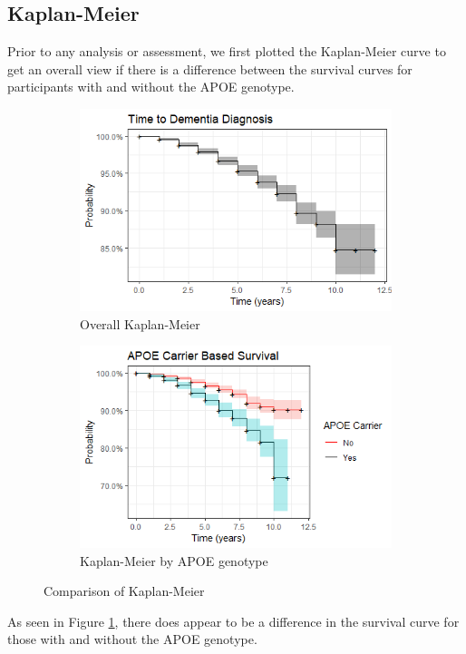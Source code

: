 \documentclass[a4paper,man,natbib,11pt]{article}
\begin{document}
\subsection{Kaplan-Meier}

Prior to any analysis or assessment, we first plotted the Kaplan-Meier curve to get an overall view if there is a difference between the survival curves for participants with and without the APOE genotype. 

\begin{figure}[h!]
\centering
\begin{subfigure}{.5\textwidth}
  \centering
  \includegraphics[width=0.75\linewidth]{figures/KM1.png}
  \caption{Overall Kaplan-Meier}
\end{subfigure}%
\begin{subfigure}{.5\textwidth}
  \centering
  \includegraphics[width=0.75\linewidth]{figures/KM2.png}
  \caption{Kaplan-Meier by APOE genotype}
\end{subfigure}
\caption{Comparison of Kaplan-Meier}
\label{fig:KM}
\end{figure}

As seen in Figure \ref{fig:KM}, there does appear to be a difference in the survival curve for those with and without the APOE genotype.
\end{document}
